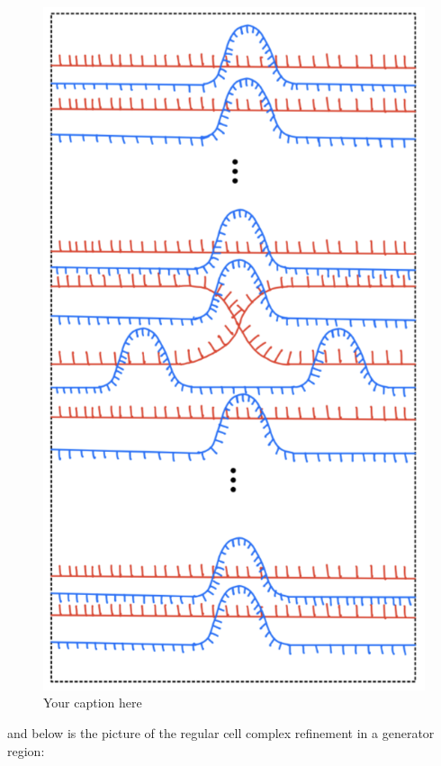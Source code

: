 \begin{definition}
\begin{figure}[H] 
    \centering
    \includegraphics[scale = 0.95]{diagrams/local_systems_on_as_diagrams/12.png} 
    \caption{Your caption here}
    \label{fig:your-label}
\end{figure}

and below is the picture of the regular cell complex refinement in a generator region:


\end{definition}
